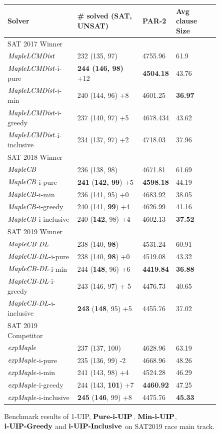 \begin{figure} 
\begin{center}
\begin{tabular}{ | m{3.7cm} | m{4cm}| m{2cm} | m{2.75cm} |  } 
\hline
Solver & \# solved (SAT, UNSAT) & PAR-2 & Avg clause Size \\ 
\hline
SAT 2017 Winner & & & \\
$\textit{MapleLCMDist}$ & 232 (135, 97) & 4755.96 & 61.9  \\ 
\hline
$\textit{MapleLCMDist}$-i-pure & \textbf{244 (146, 98)} +12 & \textbf{4504.18} & 43.76 \\
\hline
$\textit{MapleLCMDist}$-i-min & 240 (144, 96) +8 & 4601.25 & \textbf{36.97} \\ 
\hline
$\textit{MapleLCMDist}$-i-greedy & 237 (140, 97) +5 & 4678.434 & 43.62 \\ 
\hline
$\textit{MapleLCMDist}$-i-inclusive & 234 (137, 97) +2 & 4718.03 & 37.96 \\
\hline
\hline
SAT 2018 Winner & & & \\
$\textit{MapleCB}$ & 236 (138, 98) & 4671.81 & 61.69 \\
\hline
$\textit{MapleCB}$-i-pure & \textbf{241} (\textbf{142, 99}) +5 & \textbf{4598.18} & 44.19 \\
\hline
$\textit{MapleCB}$-i-min & 236 (141, 95) +0 & 4683.92 & 38.05 \\ 
\hline
$\textit{MapleCB}$-i-greedy & 240 (141, \textbf{99}) +4 & 4626.99 & 41.16 \\
\hline
$\textit{MapleCB}$-i-inclusive & 240 (\textbf{142}, 98) +4 & 4602.13 & \textbf{37.52} \\
\hline
\hline
SAT 2019 Winner & & & \\
$\textit{MapleCB-DL}$ & 238 (140, \textbf{98}) & 4531.24 & 60.91 \\
\hline
$\textit{MapleCB-DL}$-i-pure & 238 (140, \textbf{98}) +0 & 4519.08 &  43.32\\
\hline
$\textit{MapleCB-DL}$-i-min & 244 (\textbf{148}, 96) +6 & \textbf{4419.84} & \textbf{36.88} \\
\hline
$\textit{MapleCB-DL}$-i-greedy & 243 (146, 97) + 5 & 4476.73 & 40.65 \\
\hline
$\textit{MapleCB-DL}$-i-inclusive & \textbf{243} (\textbf{148}, 95) +5 & 4455.76 & 37.02 \\
\hline
\hline
SAT 2019 Competitor & & &\\
$\textit{expMaple}$ & 237 (137, 100)  & 4628.96 & 63.19 \\
\hline
$\textit{expMaple}$-i-pure & 235 (136, 99) -2  & 4668.96 & 48.26 \\
\hline
$\textit{expMaple}$-i-min & 241 (143, 98) +4 & 4524.28 & 46.29 \\ 
\hline
$\textit{expMaple}$-i-greedy & 244 (143, \textbf{101}) +7 & \textbf{4460.92} & 47.25 \\
\hline
$\textit{expMaple}$-i-inclusive & \textbf{245} (\textbf{146}, 99) +8 & 4475.76 & \textbf{45.33} \\
\hline
\end{tabular}
\end{center}
\caption{Benchmark results of 1-UIP, $\textbf{Pure-i-UIP}$. $\textbf{Min-i-UIP}$, $\textbf{i-UIP-Greedy}$ and $\textbf{i-UIP-Inclusive}$ on SAT2019 race main track.}
\label{fig:t5}
\end{figure}

